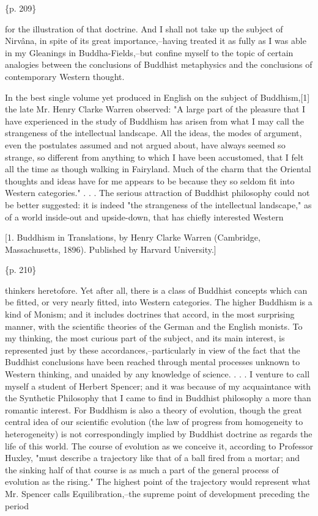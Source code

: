 \{p. 209\}

for the illustration of that doctrine. And I shall not take up the subject of Nirvâna, in spite of its great importance,--having treated it as fully as I was able in my Gleanings in Buddha-Fields,--but confine myself to the topic of certain analogies between the conclusions of Buddhist metaphysics and the conclusions of contemporary Western thought.



In the best single volume yet produced in English on the subject of Buddhism,[1] the late Mr. Henry Clarke Warren observed: "A large part of the pleasure that I have experienced in the study of Buddhism has arisen from what I may call the strangeness of the intellectual landscape. All the ideas, the modes of argument, even the postulates assumed and not argued about, have always seemed so strange, so different from anything to which I have been accustomed, that I felt all the time as though walking in Fairyland. Much of the charm that the Oriental thoughts and ideas have for me appears to be because they so seldom fit into Western categories." . . . The serious attraction of Buddhist philosophy could not be better suggested: it is indeed "the strangeness of the intellectual landscape," as of a world inside-out and upside-down, that has chiefly interested Western

[1. Buddhism in Translations, by Henry Clarke Warren (Cambridge, Massachusetts, 1896). Published by Harvard University.]

\{p. 210\}

thinkers heretofore. Yet after all, there is a class of Buddhist concepts which can be fitted, or very nearly fitted, into Western categories. The higher Buddhism is a kind of Monism; and it includes doctrines that accord, in the most surprising manner, with the scientific theories of the German and the English monists. To my thinking, the most curious part of the subject, and its main interest, is represented just by these accordances,--particularly in view of the fact that the Buddhist conclusions have been reached through mental processes unknown to Western thinking, and unaided by any knowledge of science. . . . I venture to call myself a student of Herbert Spencer; and it was because of my acquaintance with the Synthetic Philosophy that I came to find in Buddhist philosophy a more than romantic interest. For Buddhism is also a theory of evolution, though the great central idea of our scientific evolution (the law of progress from homogeneity to heterogeneity) is not correspondingly implied by Buddhist doctrine as regards the life of this world. The course of evolution as we conceive it, according to Professor Huxley, "must describe a trajectory like that of a ball fired from a mortar; and the sinking half of that course is as much a part of the general process of evolution as the rising." The highest point of the trajectory would represent what Mr. Spencer calls Equilibration,--the supreme point of development preceding the period

